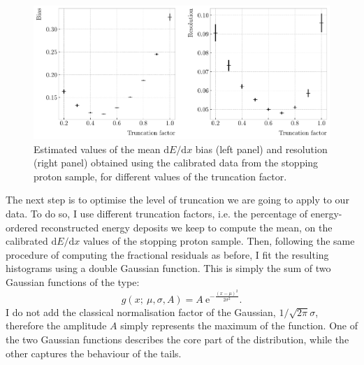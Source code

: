 \begin{figure}[t]
	\centering
	\includegraphics[width=.90\linewidth]{Images/GArSoft_PID/dEdx/reco_dEdx_truncation_opt.pdf}
	\caption[Estimated values of the mean $\mathrm{d}E/\mathrm{d}x$ bias and resolution for the stopping proton sample at different values of the truncation factor.]{Estimated values of the mean $\mathrm{d}E/\mathrm{d}x$ bias (left panel) and resolution (right panel) obtained using the calibrated data from the stopping proton sample, for different values of the truncation factor.}
	\label{fig:energy_trucation_opt}
\end{figure}

The next step is to optimise the level of truncation we are going to apply to our data. To do so, I use different truncation factors, i.e. the percentage of energy-ordered reconstructed energy deposits we keep to compute the mean, on the calibrated $\mathrm{d}E/\mathrm{d}x$ values of the stopping proton sample. Then, following the same procedure of computing the fractional residuals as before, I fit the resulting histograms using a double Gaussian function. This is simply the sum of two Gaussian functions of the type:
\begin{equation}
	g(x;~\mu, \sigma, A) = A~\mathrm{e}^{-\frac{(x-\mu)^{2}}{2\sigma^{2}}}.
\end{equation}
I do not add the classical normalisation factor of the Gaussian, $1/\sqrt{2\pi}\sigma$, therefore the amplitude $A$ simply represents the maximum of the function. One of the two Gaussian functions describes the core part of the distribution, while the other captures the behaviour of the tails.

